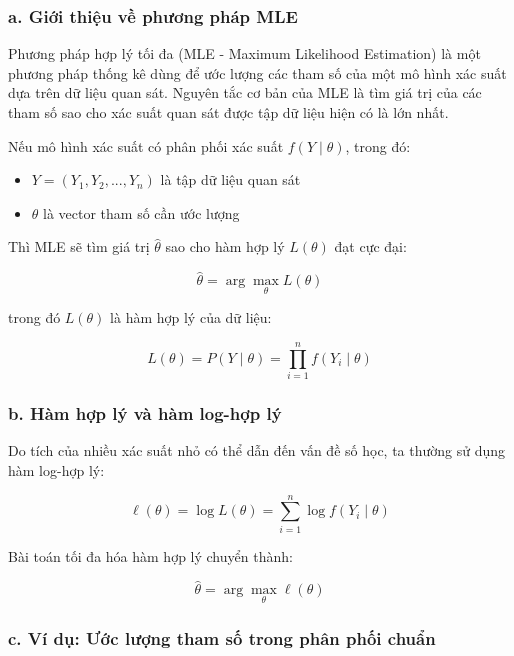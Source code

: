 \subsubsection{a. Giới thiệu về phương pháp MLE}

Phương pháp hợp lý tối đa (MLE - Maximum Likelihood Estimation) là một phương pháp thống kê dùng để ước lượng các tham số của một mô hình xác suất dựa trên dữ liệu quan sát. Nguyên tắc cơ bản của MLE là tìm giá trị của các tham số sao cho xác suất quan sát được tập dữ liệu hiện có là lớn nhất.

Nếu mô hình xác suất có phân phối xác suất $f(Y \mid \theta)$, trong đó:

\begin{itemize}
    \item $Y = (Y_1, Y_2, ..., Y_n)$ là tập dữ liệu quan sát
    \item $\theta$ là vector tham số cần ước lượng
\end{itemize}

Thì MLE sẽ tìm giá trị $\hat{\theta}$ sao cho hàm hợp lý $L(\theta)$ đạt cực đại:

\begin{equation}
\hat{\theta} = \arg\max_{\theta} L(\theta)
\end{equation}

trong đó $L(\theta)$ là hàm hợp lý của dữ liệu:

\begin{equation}
L(\theta) = P(Y \mid \theta) = \prod_{i=1}^{n} f(Y_i \mid \theta)
\end{equation}

\subsubsection{b. Hàm hợp lý và hàm log-hợp lý}

Do tích của nhiều xác suất nhỏ có thể dẫn đến vấn đề số học, ta thường sử dụng hàm log-hợp lý:

\begin{equation}
\ell(\theta) = \log L(\theta) = \sum_{i=1}^{n} \log f(Y_i \mid \theta)
\end{equation}

Bài toán tối đa hóa hàm hợp lý chuyển thành:

\begin{equation}
\hat{\theta} = \arg\max_{\theta} \ell(\theta)
\end{equation}

\subsubsection{c. Ví dụ: Ước lượng tham số trong phân phối chuẩn}

